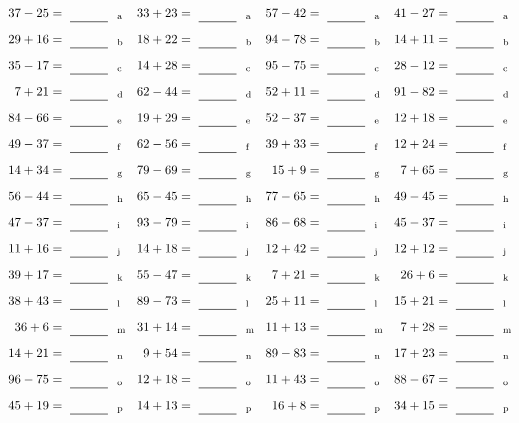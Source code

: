 \documentclass
[
  draft    = true,
  fontsize = 11pt,
  parskip  = half-
]
{scrartcl}
\begin{document}
\clearpage
\begin{align*}
    \pline{37-25}&=\rline{a}
  & \pline{33+23}&=\rline{a}
  & \pline{57-42}&=\rline{a}
  & \pline{41-27}&=\rline{a} \\[1ex]
    \pline{29+16}&=\rline{b}
  & \pline{18+22}&=\rline{b}
  & \pline{94-78}&=\rline{b}
  & \pline{14+11}&=\rline{b} \\[1ex]
    \pline{35-17}&=\rline{c}
  & \pline{14+28}&=\rline{c}
  & \pline{95-75}&=\rline{c}
  & \pline{28-12}&=\rline{c} \\[1ex]
    \pline{7+21}&=\rline{d}
  & \pline{62-44}&=\rline{d}
  & \pline{52+11}&=\rline{d}
  & \pline{91-82}&=\rline{d} \\[1ex]
    \pline{84-66}&=\rline{e}
  & \pline{19+29}&=\rline{e}
  & \pline{52-37}&=\rline{e}
  & \pline{12+18}&=\rline{e} \\[1ex]
    \pline{49-37}&=\rline{f}
  & \pline{62-56}&=\rline{f}
  & \pline{39+33}&=\rline{f}
  & \pline{12+24}&=\rline{f} \\[1ex]
    \pline{14+34}&=\rline{g}
  & \pline{79-69}&=\rline{g}
  & \pline{15+9}&=\rline{g}
  & \pline{7+65}&=\rline{g} \\[1ex]
    \pline{56-44}&=\rline{h}
  & \pline{65-45}&=\rline{h}
  & \pline{77-65}&=\rline{h}
  & \pline{49-45}&=\rline{h} \\[1ex]
    \pline{47-37}&=\rline{i}
  & \pline{93-79}&=\rline{i}
  & \pline{86-68}&=\rline{i}
  & \pline{45-37}&=\rline{i} \\[1ex]
    \pline{11+16}&=\rline{j}
  & \pline{14+18}&=\rline{j}
  & \pline{12+42}&=\rline{j}
  & \pline{12+12}&=\rline{j} \\[1ex]
    \pline{39+17}&=\rline{k}
  & \pline{55-47}&=\rline{k}
  & \pline{7+21}&=\rline{k}
  & \pline{26+6}&=\rline{k} \\[1ex]
    \pline{38+43}&=\rline{l}
  & \pline{89-73}&=\rline{l}
  & \pline{25+11}&=\rline{l}
  & \pline{15+21}&=\rline{l} \\[1ex]
    \pline{36+6}&=\rline{m}
  & \pline{31+14}&=\rline{m}
  & \pline{11+13}&=\rline{m}
  & \pline{7+28}&=\rline{m} \\[1ex]
    \pline{14+21}&=\rline{n}
  & \pline{9+54}&=\rline{n}
  & \pline{89-83}&=\rline{n}
  & \pline{17+23}&=\rline{n} \\[1ex]
    \pline{96-75}&=\rline{o}
  & \pline{12+18}&=\rline{o}
  & \pline{11+43}&=\rline{o}
  & \pline{88-67}&=\rline{o} \\[1ex]
    \pline{45+19}&=\rline{p}
  & \pline{14+13}&=\rline{p}
  & \pline{16+8}&=\rline{p}
  & \pline{34+15}&=\rline{p}
\end{align*}
\end{document}
